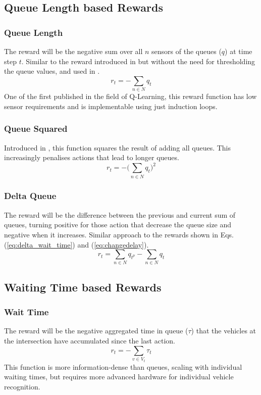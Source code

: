 \documentclass{article}
\begin{document}
\subsection{Queue Length based Rewards}
\subsubsection{Queue Length}
The reward will be the negative sum over all $n$ sensors of the queues ($q$) at time step $t$.
Similar to the reward introduced in \cite{prashanth2011} but without the need for thresholding the queue values, and used in \cite{aslani2019}.
\begin{equation}
    r_t = - \sum_{n \in N} q_{t}
\label{eq:queue}
\end{equation}
One of the first published in the field of Q-Learning, this reward function has low sensor requirements and is implementable using just induction loops.

\subsubsection{Queue Squared}
Introduced in \cite{gendersthesis}, this function squares the result of adding all queues.
This increasingly penalises actions that lead to longer queues.
\begin{equation}
   r_t = - \bigg( \sum_{n \in N} q_{t} \bigg)^2
\label{eq:queuesq} 
\end{equation}

\subsubsection{Delta Queue}
The reward will be the difference between the previous and current sum of queues, turning positive for those action that decrease the queue size and negative when it increases.
Similar approach to the rewards shown in Eqs. (\ref{eq:delta_wait_time}) and (\ref{eq:changedelay}).
\begin{equation}
    r_t = \sum_{n \in N} q_{t^p} - \sum_{n \in N} q_{t}
    \label{deltaqueue}
\end{equation}

\subsection{Waiting Time based Rewards}
\subsubsection{Wait Time}
The reward will be the negative aggregated time in queue ($\tau$) that the vehicles at the intersection have accumulated since the last action. 
\begin{equation}
r_t = - \sum_{v \in V_t} \tau_{t}
\label{eq:wait_time}
\end{equation}
This function is more information-dense than queues, scaling with individual waiting times, but requires more advanced hardware for individual vehicle recognition.
\end{document}
